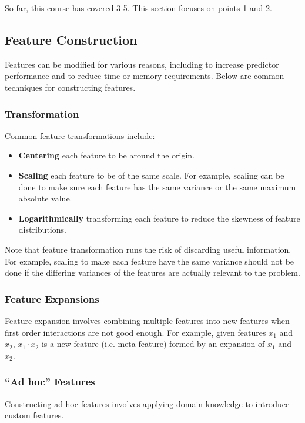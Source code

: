 \documentclass[12pt,titlepage]{article}
\begin{document}
    So far, this course has covered 3-5. This section focuses on points 1 and 2.

    \subsection{Feature Construction}
      Features can be modified for various reasons, including to increase predictor performance and to reduce time or memory requirements.
      Below are common techniques for constructing features.

      \subsubsection{Transformation}
        Common feature transformations include:
        \begin{itemize}
          \item \textbf{Centering} each feature to be around the origin.
          \item \textbf{Scaling} each feature to be of the same scale. For example, scaling can be done to make sure each feature has the same
            variance or the same maximum absolute value.
          \item \textbf{Logarithmically} transforming each feature to reduce the skewness of feature distributions.
        \end{itemize}

        Note that feature transformation runs the risk of discarding useful information. For example, scaling to make each feature have the same
        variance should not be done if the differing variances of the features are actually relevant to the problem.

      \subsubsection{Feature Expansions}
        Feature expansion involves combining multiple features into new features when first order interactions are not good enough. For example, given
        features $x_1$ and $x_2$, $x_1 \cdot x_2$ is a new feature (i.e. meta-feature) formed by an expansion of $x_1$ and $x_2$.

      \subsubsection{``Ad hoc'' Features}
        Constructing ad hoc features involves applying domain knowledge to introduce custom features.
\end{document}
